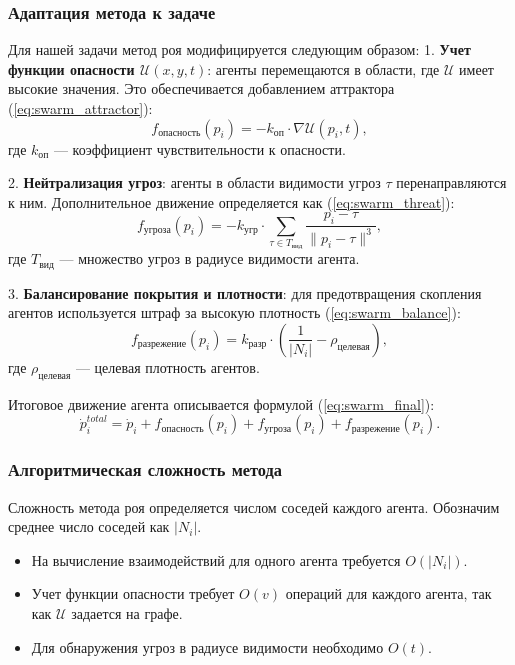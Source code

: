 \subsubsection*{Адаптация метода к задаче}
Для нашей задачи метод роя модифицируется следующим образом:  
1. \textbf{Учет функции опасности $\mathcal{U}(x, y, t)$}: агенты перемещаются в области, где $\mathcal{U}$ имеет высокие значения.
Это обеспечивается добавлением аттрактора (\ref{eq:swarm_attractor}):
\begin{equation}
	\label{eq:swarm_attractor}
	f_{\text{опасность}}(p_i) = -k_{\text{оп}} \cdot \nabla \mathcal{U}(p_i, t),
\end{equation}
где $k_{\text{оп}}$ — коэффициент чувствительности к опасности.

2. \textbf{Нейтрализация угроз}: агенты в области видимости угроз $\tau$ перенаправляются к ним.
Дополнительное движение определяется как (\ref{eq:swarm_threat}):
\begin{equation}
	\label{eq:swarm_threat}
	f_{\text{угроза}}(p_i) = -k_{\text{угр}} \cdot \sum_{\tau \in T_{\text{вид}}} \frac{p_i - \tau}{\|p_i - \tau\|^3},
\end{equation}
где $T_{\text{вид}}$ — множество угроз в радиусе видимости агента.

3. \textbf{Балансирование покрытия и плотности}: для предотвращения скопления агентов используется штраф за высокую плотность (\ref{eq:swarm_balance}):
\begin{equation}
	\label{eq:swarm_balance}
	f_{\text{разрежение}}(p_i) = k_{\text{разр}} \cdot \left( \frac{1}{|N_i|} - \rho_{\text{целевая}} \right),
\end{equation}
где $\rho_{\text{целевая}}$ — целевая плотность агентов.

Итоговое движение агента описывается формулой (\ref{eq:swarm_final}):
\begin{equation}
	\label{eq:swarm_final}
	\dot{p}_i^{total} =\dot{p}_i + f_{\text{опасность}}(p_i) + f_{\text{угроза}}(p_i) + f_{\text{разрежение}}(p_i).
\end{equation}

\subsubsection*{Алгоритмическая сложность метода}
Сложность метода роя определяется числом соседей каждого агента.
Обозначим среднее число соседей как $|N_i|$.

\begin{itemize}
	\item На вычисление взаимодействий для одного агента требуется $O(|N_i|)$.
	\item Учет функции опасности требует $O(v)$ операций для каждого агента, так как $\mathcal{U}$ задается на графе.
	\item Для обнаружения угроз в радиусе видимости необходимо $O(t)$.
\end{itemize}

